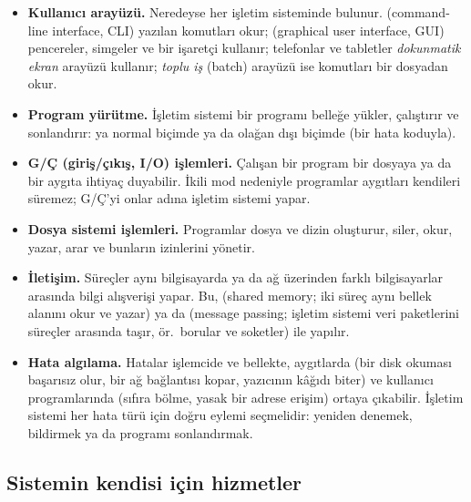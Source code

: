 \begin{itemize}
  \item \textbf{Kullanıcı arayüzü.} Neredeyse her işletim sisteminde bulunur.  (command-line interface, CLI) yazılan komutları okur;  (graphical user interface, GUI) pencereler, simgeler ve bir işaretçi kullanır; telefonlar ve tabletler \emph{dokunmatik ekran} arayüzü kullanır; \emph{toplu iş} (batch) arayüzü ise komutları bir dosyadan okur.
  \item \textbf{Program yürütme.} İşletim sistemi bir programı belleğe yükler, çalıştırır ve sonlandırır: ya normal biçimde ya da olağan dışı biçimde (bir hata koduyla).
  \item \textbf{G/Ç (giriş/çıkış, I/O) işlemleri.} Çalışan bir program bir dosyaya ya da bir aygıta ihtiyaç duyabilir. İkili mod nedeniyle programlar aygıtları kendileri süremez; G/Ç'yi onlar adına işletim sistemi yapar.
  \item \textbf{Dosya sistemi işlemleri.} Programlar dosya ve dizin oluşturur, siler, okur, yazar, arar ve bunların izinlerini yönetir.
  \item \textbf{İletişim.} Süreçler aynı bilgisayarda ya da ağ üzerinden farklı bilgisayarlar arasında bilgi alışverişi yapar. Bu,  (shared memory; iki süreç aynı bellek alanını okur ve yazar) ya da  (message passing; işletim sistemi veri paketlerini süreçler arasında taşır, ör.\ borular ve soketler) ile yapılır.
  \item \textbf{Hata algılama.} Hatalar işlemcide ve bellekte, aygıtlarda (bir disk okuması başarısız olur, bir ağ bağlantısı kopar, yazıcının kâğıdı biter) ve kullanıcı programlarında (sıfıra bölme, yasak bir adrese erişim) ortaya çıkabilir. İşletim sistemi her hata türü için doğru eylemi seçmelidir: yeniden denemek, bildirmek ya da programı sonlandırmak.
\end{itemize}

\subsection{Sistemin kendisi için hizmetler}

